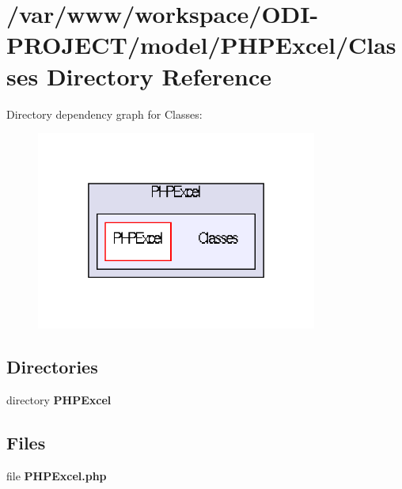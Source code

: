 \section{/var/www/workspace/\+O\+D\+I-\/\+P\+R\+O\+J\+E\+C\+T/model/\+P\+H\+P\+Excel/\+Classes Directory Reference}
\label{dir_f7b845b99a351267716a8551794f4d70}
Directory dependency graph for Classes\+:\nopagebreak
\begin{figure}[H]
\begin{center}
\leavevmode
\includegraphics[width=262pt]{dir_f7b845b99a351267716a8551794f4d70_dep}
\end{center}
\end{figure}
\subsection*{Directories}
\begin{DoxyCompactItemize}
\item 
directory {\bf P\+H\+P\+Excel}
\end{DoxyCompactItemize}
\subsection*{Files}
\begin{DoxyCompactItemize}
\item 
file {\bfseries P\+H\+P\+Excel.\+php}
\end{DoxyCompactItemize}
